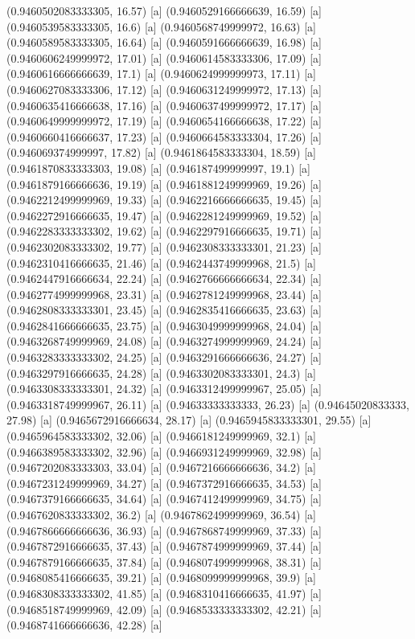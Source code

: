 {{{(0.9460502083333305, 16.57) [a] 
(0.9460529166666639, 16.59) [a] 
(0.9460539583333305, 16.6) [a] 
(0.9460568749999972, 16.63) [a] 
(0.9460589583333305, 16.64) [a] 
(0.9460591666666639, 16.98) [a] 
(0.9460606249999972, 17.01) [a] 
(0.9460614583333306, 17.09) [a] 
(0.9460616666666639, 17.1) [a] 
(0.9460624999999973, 17.11) [a] 
(0.9460627083333306, 17.12) [a] 
(0.9460631249999972, 17.13) [a] 
(0.9460635416666638, 17.16) [a] 
(0.9460637499999972, 17.17) [a] 
(0.9460649999999972, 17.19) [a] 
(0.9460654166666638, 17.22) [a] 
(0.9460660416666637, 17.23) [a] 
(0.9460664583333304, 17.26) [a] 
(0.946069374999997, 17.82) [a] 
(0.9461864583333304, 18.59) [a] 
(0.9461870833333303, 19.08) [a] 
(0.946187499999997, 19.1) [a] 
(0.9461879166666636, 19.19) [a] 
(0.9461881249999969, 19.26) [a] 
(0.9462212499999969, 19.33) [a] 
(0.9462216666666635, 19.45) [a] 
(0.9462272916666635, 19.47) [a] 
(0.9462281249999969, 19.52) [a] 
(0.9462283333333302, 19.62) [a] 
(0.9462297916666635, 19.71) [a] 
(0.9462302083333302, 19.77) [a] 
(0.9462308333333301, 21.23) [a] 
(0.9462310416666635, 21.46) [a] 
(0.9462443749999968, 21.5) [a] 
(0.9462447916666634, 22.24) [a] 
(0.9462766666666634, 22.34) [a] 
(0.9462774999999968, 23.31) [a] 
(0.9462781249999968, 23.44) [a] 
(0.9462808333333301, 23.45) [a] 
(0.9462835416666635, 23.63) [a] 
(0.9462841666666635, 23.75) [a] 
(0.9463049999999968, 24.04) [a] 
(0.9463268749999969, 24.08) [a] 
(0.9463274999999969, 24.24) [a] 
(0.9463283333333302, 24.25) [a] 
(0.9463291666666636, 24.27) [a] 
(0.9463297916666635, 24.28) [a] 
(0.9463302083333301, 24.3) [a] 
(0.9463308333333301, 24.32) [a] 
(0.9463312499999967, 25.05) [a] 
(0.9463318749999967, 26.11) [a] 
(0.94633333333333, 26.23) [a] 
(0.94645020833333, 27.98) [a] 
(0.9465672916666634, 28.17) [a] 
(0.9465945833333301, 29.55) [a] 
(0.9465964583333302, 32.06) [a] 
(0.9466181249999969, 32.1) [a] 
(0.9466389583333302, 32.96) [a] 
(0.9466931249999969, 32.98) [a] 
(0.9467202083333303, 33.04) [a] 
(0.9467216666666636, 34.2) [a] 
(0.9467231249999969, 34.27) [a] 
(0.9467372916666635, 34.53) [a] 
(0.9467379166666635, 34.64) [a] 
(0.9467412499999969, 34.75) [a] 
(0.9467620833333302, 36.2) [a] 
(0.9467862499999969, 36.54) [a] 
(0.9467866666666636, 36.93) [a] 
(0.9467868749999969, 37.33) [a] 
(0.9467872916666635, 37.43) [a] 
(0.9467874999999969, 37.44) [a] 
(0.9467879166666635, 37.84) [a] 
(0.9468074999999968, 38.31) [a] 
(0.9468085416666635, 39.21) [a] 
(0.9468099999999968, 39.9) [a] 
(0.9468308333333302, 41.85) [a] 
(0.9468310416666635, 41.97) [a] 
(0.9468518749999969, 42.09) [a] 
(0.9468533333333302, 42.21) [a] 
(0.9468741666666636, 42.28) [a] 
}}}
